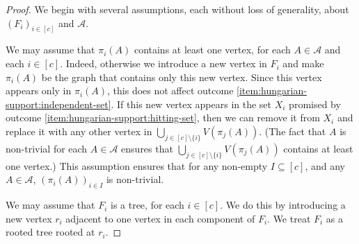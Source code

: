 \documentclass{patmorin}
\begin{document}
\begin{proof}
  We begin with several assumptions, each without loss of generality, about $(F_i)_{i\in[c]}$ and $\mathcal{A}$.

  We may assume that $\pi_i(A)$ contains at least one vertex, for each $A\in\mathcal{A}$ and each $i\in[c]$. Indeed, otherwise we introduce a new vertex in $F_i$ and make $\pi_i(A)$ be the graph that contains only this new vertex. Since this vertex appears only in $\pi_i(A)$, this does not affect outcome \cref{item:hungarian-support:independent-set}. If this new vertex appears in the set $X_i$ promised by outcome \cref{item:hungarian-support:hitting-set}, then we can remove it from $X_i$ and replace it with any other vertex in $\bigcup_{j\in[c]\setminus\{i\}}V(\pi_j(A))$.  (The fact that $A$ is non-trivial for each $A\in\mathcal{A}$ ensures that $\bigcup_{j\in[c]\setminus\{i\}}V(\pi_j(A))$ contains at least one vertex.)  This assumption ensures that for any non-empty $I\subseteq[c]$, and any $A\in\mathcal{A}$, $(\pi_i(A))_{i\in I}$ is non-trivial.

  We may assume that $F_i$ is a tree, for each $i\in[c]$.  We do this by introducing a new vertex $r_i$ adjacent to one vertex in each component of $F_i$.  We treat $F_i$ as a rooted tree rooted at $r_i$.


\end{proof}
\end{document}

